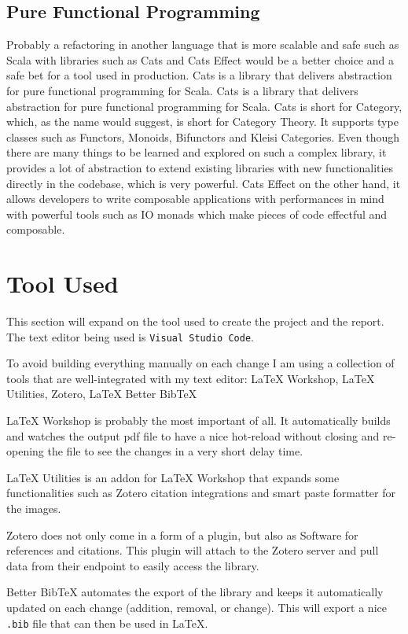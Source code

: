 \subsection{Pure Functional Programming}
\label{s:Pure-Functional-Programming}
Probably a refactoring in another language that is more scalable and safe such
as Scala with libraries such as Cats and Cats Effect would be a better choice
and a safe bet for a tool used in production. Cats is a library that delivers
abstraction for pure functional programming for Scala. Cats is a library that
delivers abstraction for pure functional programming for Scala. Cats is short
for Category, which, as the name would suggest, is short for Category Theory. It
supports type classes such as Functors, Monoids, Bifunctors and Kleisi
Categories. Even though there are many things to be learned and explored on such
a complex library, it provides a lot of abstraction to extend existing libraries
with new functionalities directly in the codebase, which is very powerful. Cats
Effect on the other hand, it allows developers to write composable applications
with performances in mind with powerful tools such as IO monads which make
pieces of code effectful and composable.

\section{Tool Used}
\label{s:Tool-Used}
This section will expand on the tool used to create the project and the report.
The text editor being used is \texttt{Visual Studio Code}.

To avoid building everything manually on each change I am using a collection of
tools that are well-integrated with my text editor: LaTeX Workshop, LaTeX
Utilities, Zotero, LaTeX Better BibTeX

LaTeX Workshop is probably the most important of all. It automatically builds
and watches the output pdf file to have a nice hot-reload without closing and
re-opening the file to see the changes in a very short delay time.

LaTeX Utilities is an addon for LaTeX Workshop that expands some
functionalities such as Zotero citation integrations and smart paste formatter
for the images.

Zotero does not only come in a form of a plugin, but also as Software for
references and citations. This plugin will attach to the Zotero server and pull
data from their endpoint to easily access the library.

Better BibTeX automates the export of the library and keeps it automatically
updated on each change (addition, removal, or change). This will export a nice
\texttt{.bib} file that can then be used in LaTeX.


